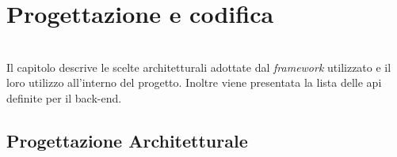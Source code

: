 
\chapter{Progettazione e codifica}
\label{cap:progettazione-codifica}

\\
Il capitolo descrive le scelte architetturali adottate dal \emph{framework} utilizzato e il loro utilizzo all'interno del progetto. Inoltre viene presentata la lista delle \gls{api} definite per il \gls{back-end}.


\section{Progettazione Architetturale}

